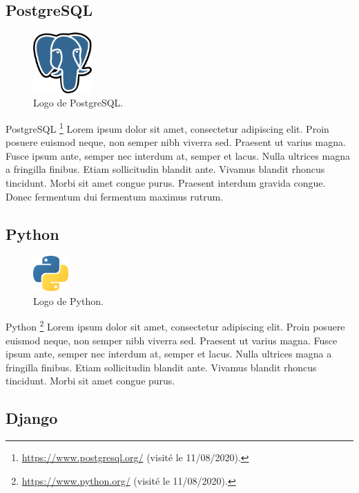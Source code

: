 \subsection*{PostgreSQL}
\begin{figure}
  \centering
  \includegraphics[width=0.2\textwidth]{images_pfe/postgres_logo.png}
  \caption{Logo de PostgreSQL.}
\end{figure}
\FloatBarrier
PostgreSQL \footnote{\url{https://www.postgresql.org/} (visité le 11/08/2020).} Lorem ipsum dolor sit amet, consectetur adipiscing elit. Proin posuere euismod neque, non semper nibh viverra sed. Praesent ut varius magna. Fusce ipsum ante, semper nec interdum at, semper et lacus. Nulla ultrices magna a fringilla finibus. Etiam sollicitudin blandit ante. Vivamus blandit rhoncus tincidunt. Morbi sit amet congue purus. Praesent interdum gravida congue. Donec fermentum dui fermentum maximus rutrum.


\subsection*{Python}

\begin{figure}
  \centering
  \includegraphics[width=0.12\textwidth]{images_pfe/python_logo.png}
  \caption{Logo de Python.}
\end{figure}
\FloatBarrier
Python \footnote{\url{https://www.python.org/} (visité le 11/08/2020).} Lorem ipsum dolor sit amet, consectetur adipiscing elit. Proin posuere euismod neque, non semper nibh viverra sed. Praesent ut varius magna. Fusce ipsum ante, semper nec interdum at, semper et lacus. Nulla ultrices magna a fringilla finibus. Etiam sollicitudin blandit ante. Vivamus blandit rhoncus tincidunt. Morbi sit amet congue purus.

\vspace{.5cm}

\subsection*{Django}


